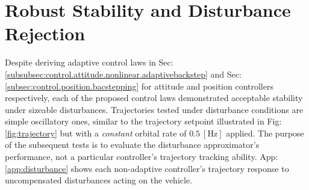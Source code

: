 \section{Robust Stability and Disturbance Rejection}
\label{sec:simulation.disturbance}
Despite deriving adaptive control laws in Sec:\ref{subsubsec:control.attitude.nonlinear.adaptivebackstep} and Sec:\ref{subsec:control.position.bacstepping} for attitude and position controllers respectively, each of the proposed control laws demonstrated acceptable stability under sizeable disturbances. Trajectories tested under disturbance conditions are simple oscillatory ones, similar to the trajectory setpoint illustrated in Fig:\ref{fig:trajectory} but with a \emph{constant} orbital rate of $0.5~[\text{Hz}]$ applied. The purpose of the subsequent tests is to evaluate the disturbance approximator's performance, not a particular controller's trajectory tracking ability. App:\ref{app:disturbance} shows each non-adaptive controller's trajectory response to uncompensated disturbances acting on the vehicle.
